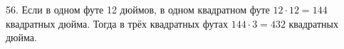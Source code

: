 56. Если в одном футе 12 дюймов, в одном квадратном футе $12\cdot12=144$ квадратных дюйма. Тогда в трёх квадратных футах $144\cdot3=432$ квадратных дюйма.\\
